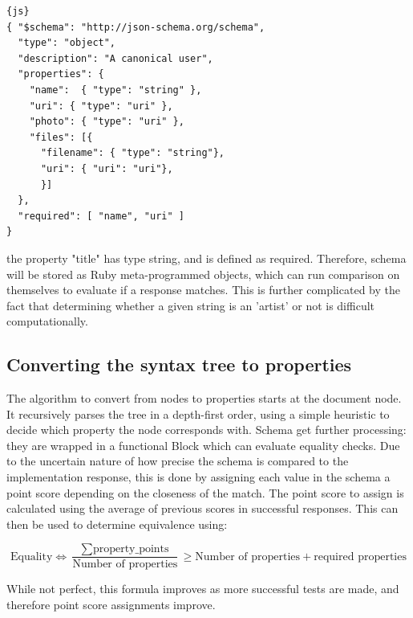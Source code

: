 \begin{lstlisting}[frame=lines]{js}
{ "$schema": "http://json-schema.org/schema",
  "type": "object",
  "description": "A canonical user",
  "properties": {
    "name":  { "type": "string" },
    "uri": { "type": "uri" },
    "photo": { "type": "uri" },
    "files": [{
      "filename": { "type": "string"},
      "uri": { "uri": "uri"},
      }]
  },
  "required": [ "name", "uri" ]
}
\end{lstlisting}

the property "title" has type string, and is defined as required. Therefore, schema will be stored as Ruby meta-programmed objects, which can run comparison on themselves to evaluate if a response matches. This is further complicated by the fact that determining whether a given string is an 'artist' or not is difficult computationally.

\subsection{Converting the syntax tree to properties}

The algorithm to convert from nodes to properties starts at the document node. It recursively parses the tree in a depth-first order, using a simple heuristic to decide which property the node corresponds with. Schema get further processing: they are wrapped in a functional Block which can evaluate equality checks. Due to the uncertain nature of how precise the schema is compared to the implementation response, this is done by assigning each value in the schema a point score depending on the closeness of the match. The point score to assign is calculated using the average of previous scores in successful responses.  This can then be used to determine equivalence using:

\[
\textrm{Equality} \iff \frac{\sum{\textrm{property\_points}}}{\textrm{Number of properties}} \geq \textrm{Number of properties} + \textrm{required properties}
\]

While not perfect, this formula improves as more successful tests are made, and therefore point score assignments improve.

\begin{center}
\end{center}

